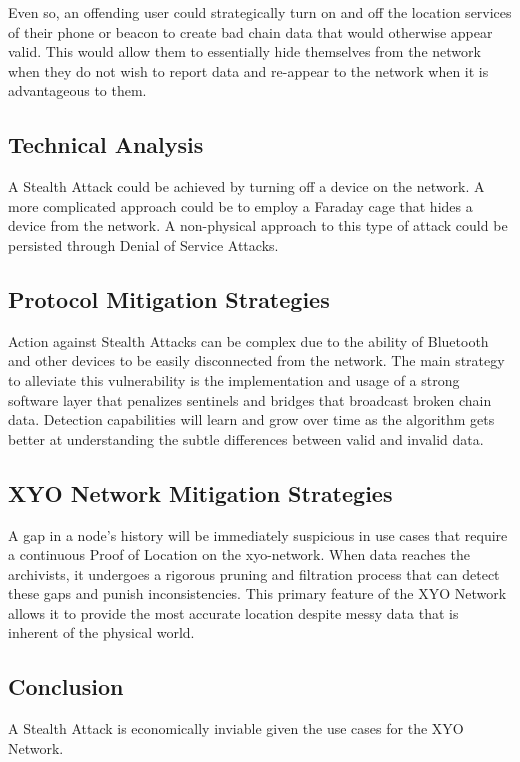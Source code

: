 \documentclass{article}
\begin{document}
Even so, an offending user could strategically turn on and off the location services of their phone or beacon to create bad chain data that would otherwise appear valid. This would allow them to essentially hide themselves from the network when they do not wish to report data and re-appear to the network when it is advantageous to them.

\subsection{Technical Analysis}
A Stealth Attack could be achieved by turning off a device on the network. A more complicated approach could be to employ a Faraday cage that hides a device from the network. A non-physical approach to this type of attack could be persisted through Denial of Service Attacks. 

\subsection{Protocol Mitigation Strategies}
Action against Stealth Attacks can be complex due to the ability of Bluetooth and other devices to be easily disconnected from the network. The main strategy to alleviate this vulnerability is the implementation and usage of a strong software layer that penalizes \Glspl{sentinel} and \Glspl{bridge} that broadcast broken chain data. Detection capabilities will learn and grow over time as the algorithm gets better at understanding the subtle differences between valid and invalid data.

\subsection{XYO Network Mitigation Strategies}
A gap in a node's history will be immediately suspicious in use cases that require a continuous Proof of Location on the \Gls{xyo-network}. When data reaches the \Glspl{archivist}, it undergoes a rigorous pruning and filtration process that can detect these gaps and punish inconsistencies. This primary feature of the XYO Network allows it to provide the most accurate location despite messy data that is inherent of the physical world. 

\subsection{Conclusion}
A Stealth Attack is economically inviable given the use cases for the XYO Network.
\end{document}
